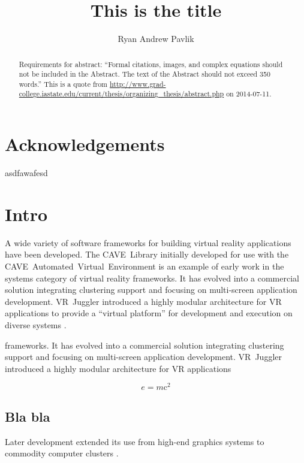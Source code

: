 \documentclass[capstoc,capschap,draftcls]{rpisudiss}
\title{This is the title}
\author{Ryan Andrew Pavlik}
\begin{document}
\frontmatter
\maketitle

\tableofcontents
\listoffigures
\listoftables
\begin{abstract}
 Requirements for abstract:
 ``Formal citations, images, and complex equations should not be included in the Abstract.
 The text of the Abstract should not exceed 350 words.''
 This is a quote from \url{http://www.grad-college.iastate.edu/current/thesis/organizing_thesis/abstract.php} on 2014-07-11.
\end{abstract}

\chapter{Acknowledgements}
asdfawafesd

\mainmatter %

\chapter{Intro}


A wide variety of software frameworks for building virtual reality
applications have been developed. The CAVE~Library initially developed
for use with the CAVE~Automated~Virtual~Environment \cite{Cruz-Neira1993}
is an example of early work in the systems category of virtual reality
frameworks. It has evolved into a commercial solution integrating
clustering support and focusing on multi-screen application development.
VR~Juggler introduced a highly modular architecture for VR applications
to provide a ``virtual platform'' for development and execution
on diverse systems \cite{Bierbaum2001,Bierbaum2005}.

frameworks. It has evolved into a commercial solution integrating
clustering support and focusing on multi-screen application development.
VR~Juggler introduced a highly modular architecture for VR applications

\[e=m\mathrm{c}^2\]

\section{Bla bla}
Later development
extended its use from high-end graphics systems to commodity computer
clusters \cite{Allard2002,Bierbaum2005}.
\end{document}
